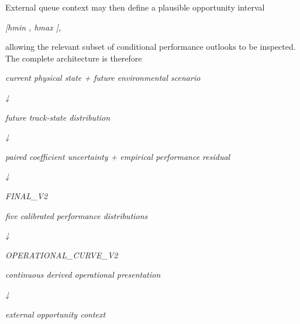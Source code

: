 External queue context may then define a plausible opportunity interval

\begin{center}\textit{[hmin , hmax ],}\end{center}

allowing the relevant subset of conditional performance outlooks to be inspected. The complete architecture is therefore

\begin{center}\textit{current physical state + future environmental scenario}\end{center}

\begin{center}\textit{↓}\end{center}

\begin{center}\textit{future track-state distribution}\end{center}

\begin{center}\textit{↓}\end{center}

\begin{center}\textit{paired coefficient uncertainty + empirical performance residual}\end{center}

\begin{center}\textit{↓}\end{center}

\begin{center}\textit{FINAL\_V2}\end{center}

\begin{center}\textit{five calibrated performance distributions}\end{center}

\begin{center}\textit{↓}\end{center}

\begin{center}\textit{OPERATIONAL\_CURVE\_V2}\end{center}

\begin{center}\textit{continuous derived operational presentation}\end{center}

\begin{center}\textit{↓}\end{center}

\begin{center}\textit{external opportunity context}\end{center}

